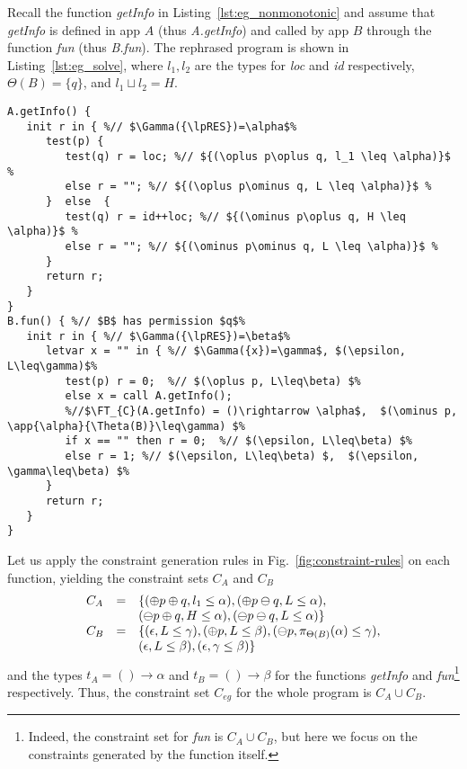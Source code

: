 {{{Recall the function \textit{getInfo} in Listing~\ref{lst:eg_nonmonotonic} and assume that \textit{getInfo} is defined in app $A$ (thus \textit{A.getInfo}) and called by app $B$ through the function \textit{fun} (thus \textit{B.fun}). The rephrased program is shown in Listing~\ref{lst:eg_solve}, where $l_1, l_2$ are the types for \textit{loc}  and \textit{id} respectively, $\Theta(B) = \{q\}$, and $l_1\sqcup l_2 = H$.
\begin{lstlisting}[float=tp, caption={The example in Listing~\ref{lst:eg_nonmonotonic} in a calling context.}, label={lst:eg_solve}]
A.getInfo() {
   init r in { %// $\Gamma({\lpRES})=\alpha$%
      test(p) {
         test(q) r = loc; %// ${(\oplus p\oplus q, l_1 \leq \alpha)}$ %
         else r = ""; %// ${(\oplus p\ominus q, L \leq \alpha)}$ %
      }  else  {
         test(q) r = id++loc; %// ${(\ominus p\oplus q, H \leq \alpha)}$ %
         else r = ""; %// ${(\ominus p\ominus q, L \leq \alpha)}$ %
      }
      return r;   
   }
}
B.fun() { %// $B$ has permission $q$%
   init r in { %// $\Gamma({\lpRES})=\beta$%
      letvar x = "" in { %// $\Gamma({x})=\gamma$, $(\epsilon, L\leq\gamma)$%
         test(p) r = 0;  %// $(\oplus p, L\leq\beta) $%
         else x = call A.getInfo();
         %//$\FT_{C}(A.getInfo) = ()\rightarrow \alpha$,  $(\ominus p, \app{\alpha}{\Theta(B)}\leq\gamma) $%
         if x == "" then r = 0;  %// $(\epsilon, L\leq\beta) $%
         else r = 1; %// $(\epsilon, L\leq\beta) $,  $(\epsilon, \gamma\leq\beta) $%
      }
      return r;    
   }
}
\end{lstlisting}


Let us apply the constraint generation rules in Fig.~\ref{fig:constraint-rules} on each function, yielding the constraint sets $C_A$ and $C_B$
\[
\begin{array}{lcl}
C_A & =  &\{(\oplus p\oplus q, l_1 \leq \alpha),(\oplus p\ominus q, L \leq \alpha), \\
 & & (\ominus p\oplus q, H \leq \alpha), (\ominus p\ominus q, L \leq \alpha) \}\\
C_B & =  & \{(\epsilon, L\leq\gamma), (\oplus p, L\leq\beta) ,(\ominus p, \pi_{{\Theta(B)}}({\alpha})\leq\gamma), \\
& & (\epsilon, L\leq\beta),(\epsilon, \gamma\leq\beta)  \}
\end{array}
\]
and the types $t_A =()\rightarrow \alpha$  and $t_B=()\rightarrow \beta$ for the functions  \textit{getInfo} and  \textit{fun}\footnote{Indeed, the constraint set for \textit{fun} is $C_A \cup C_B $, but here we focus on the constraints generated by the function itself.} respectively. Thus, the constraint set $C_{eg}$ for the whole program is $C_A \cup C_B$.

}}}
